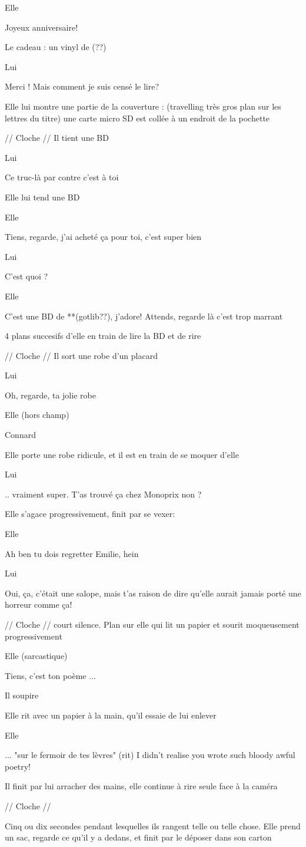 \documentclass{screenplay}
\newcommand{\speak}[2]{
\begin{dialogue}{#1}
#2
\end{dialogue}
}
\begin{document}
\speak{Elle}{
Joyeux anniversaire!
}

Le cadeau : un vinyl de (??)

\speak{Lui}{
Merci ! Mais comment je suis censé le lire?
}

Elle lui montre une partie de la couverture : (travelling très gros plan sur les lettres du titre) une carte micro SD est collée à un endroit de la pochette

// Cloche //
\temps
Il tient une BD

\speak{Lui}{
Ce truc-là par contre c'est à toi
}

Elle lui tend une BD


\speak{Elle}{
Tiens, regarde, j'ai acheté ça pour toi, c'est super bien
}

\speak{Lui}{
C'est quoi ?
}




\speak{Elle}{
C'est une BD de **(gotlib??), j'adore! Attends, regarde là c'est trop marrant
}

4 plans succesifs d'elle en train de lire la BD et de rire

// Cloche //
\temps
Il sort une robe d'un placard

\speak{Lui}{
Oh, regarde, ta jolie robe
}
\speak{Elle (hors champ)}{
Connard
}

Elle porte une robe ridicule, et il est en train de se moquer d'elle
\speak{Lui}{
.. vraiment super. T'as trouvé ça chez Monoprix non ?
}
Elle s'agace progressivement, finit par se vexer:
\speak{Elle}{
Ah ben tu dois regretter Emilie, hein
}
\speak{Lui}{
Oui, ça, c'était une salope, mais t'as raison de dire qu'elle aurait jamais porté une horreur comme ça!
}

// Cloche //
\temps
court silence. Plan sur elle qui lit un papier et sourit moqueusement progressivement

\speak{Elle (sarcastique)}{
Tiens, c'est ton poème ...
}
Il soupire

Elle rit avec un papier à la main, qu'il essaie de lui enlever

\speak{Elle}{
... "sur le fermoir de tes lèvres" (rit) I didn't realise you wrote such bloody awful poetry!
}
Il finit par lui arracher des mains, elle continue à rire seule face à la caméra

// Cloche //
\temps

Cinq ou dix secondes pendant lesquelles ils rangent telle ou telle chose.
Elle prend un sac, regarde ce qu'il y a dedans, et finit par le déposer dans son carton
\end{document}

